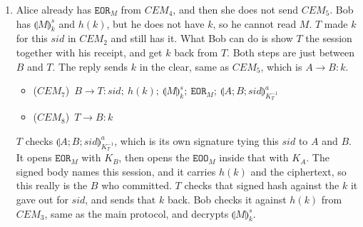\documentclass{article}
\newcommand{\setenc}[1]{\llparenthesis #1 \rrparenthesis}
\newcommand{\sym}[1]{\texttt{#1}}
\begin{document}
\begin{enumerate}
    Let $m_3$ be the term he receives in $CEM_3$, and let $a_1 = \mathrm{rcv}(m_3)$. Then $\mathrm{gets}(a_1) = \{m_3\}$ and $D^1_B = \mathrm{close}(D^0_B \cup \{m_3\})$. That set equals $\mathrm{analyz}$ of itself, so a concatenation keeps getting split, and every piece of $m_3$ is in $D^1_B$. In particular
    \[
        \setenc{M}^s_{k} \in D^1_B
        \qquad\text{and}\qquad
        h(k) \in D^1_B.
    \]
    $\mathrm{analyz}$ has no rule that gets a preimage back out of a hash, and $\mathrm{synth}$ only builds $h(k)$ when you already have $k$. So $h(k)$ does not put $k$ in $D^1_B$. The symmetric rule only gives you the plaintext when the ciphertext and the key are both already in the set. He does not have the key yet, so $M \notin D^1_B$.

    He can still open the signature. $K_A \in D^0_B$, and $D^1_B$ contains
    \[
        \sym{EOO}_M = \setenc{B;T;sid;h(k);\setenc{M}^s_{k}}^a_{K_A^{-1}}.
    \]
    The signature rule of $\mathrm{analyz}$ puts that signed body into $D^1_B$. It is the same pieces he already took out of $m_3$. There is still no $k$ in the clear, so $M$ is still not in $D^1_B$.

    Next is the send $a_2 = \mathrm{snd}(\sym{EOR}_M, A)$. A send adds nothing, so $\mathrm{gets}(a_2) = \emptyset$ and $D^2_B = \mathrm{close}(D^1_B) = D^1_B$. The ciphertext $\setenc{M}^s_{k}$ is still in there.

    Then $a_3 = \mathrm{rcv}(k)$, so $\mathrm{gets}(a_3) = \{k\}$ and $D^3_B = \mathrm{close}(D^2_B \cup \{k\})$. Now both $\setenc{M}^s_{k}$ and $k$ are in the set. The symmetric rule of $\mathrm{analyz}$ puts $M$ in, and since the closed set equals its $\mathrm{analyz}$ image,
    \[
        M \in D^3_B.
    \]
    That is the end of receiving $CEM_5$, before he sends $\sym{EOR}_k$.

    \item Alice already has $\sym{EOR}_M$ from $CEM_4$, and then she does not send $CEM_5$. Bob has $\setenc{M}^s_{k}$ and $h(k)$, but he does not have $k$, so he cannot read $M$. $T$ made $k$ for this $sid$ in $CEM_2$ and still has it. What Bob can do is show $T$ the session together with his receipt, and get $k$ back from $T$. Both steps are just between $B$ and $T$. The reply sends $k$ in the clear, same as $CEM_5$, which is $A \rightarrow B : k$.
    \begin{itemize}
        \item[] ($CEM_{7}$)\ $B\rightarrow T: sid;\ h(k);\ \setenc{M}^s_{k};\ \sym{EOR}_M;\ \setenc{A;B;sid}^a_{K^{-1}_T}$
        \item[] ($CEM_{8}$)\ $T\rightarrow B: k$
    \end{itemize}
    $T$ checks $\setenc{A;B;sid}^a_{K^{-1}_T}$, which is its own signature tying this $sid$ to $A$ and $B$. It opens $\sym{EOR}_M$ with $K_B$, then opens the $\sym{EOO}_M$ inside that with $K_A$. The signed body names this session, and it carries $h(k)$ and the ciphertext, so this really is the $B$ who committed. $T$ checks that signed hash against the $k$ it gave out for $sid$, and sends that $k$ back. Bob checks it against $h(k)$ from $CEM_3$, same as the main protocol, and decrypts $\setenc{M}^s_{k}$.
\end{enumerate}
\end{document}
